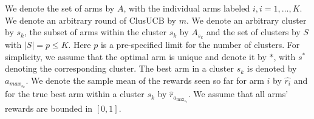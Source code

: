 We denote the set of arms by $A$, with the individual arms labeled $i, i=1,\ldots,K$.
We denote an arbitrary round of ClusUCB by $m$. We denote an arbitrary cluster by $s_{k}$, the subset of arms within the cluster $s_k$ by  $A_{s_{k}}$ and the set of clusters by $S$ with $|S|=p\leq K$. 
Here $p$ is a pre-specified limit for the number of clusters.
For simplicity, we assume that the optimal arm is unique and denote it by ${*}$, with $s^{*}$ denoting the corresponding cluster.
The best arm in a cluster $s_{k}$ is denoted by $a_{max_{s_{k}}}$.  
We denote the sample mean of the rewards seen so far for arm $i$ by $\hat{r_i}$ and for the true best arm within a cluster $s_k$ by $\hat{r}_{a_{\max_{s_{k}}}}$. 
We assume that all arms' rewards are bounded in $[0,1]$.


